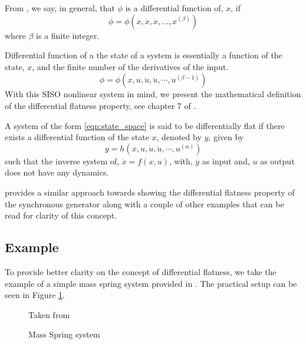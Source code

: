 \documentclass[letterpaper%
, twoside%
, 12pt%
,memoire%
, english%
,creativecommons,hyperref%
]{thETS}
\begin{document}
\begin{definition}
	From \citep{teschl2012ordinary}, we say, in general, that $\phi$ is a differential function of, $x$, if\\
	\begin{equation*}
		\phi=\phi(x,\dot{x},\ddot{x},...,x^{(\beta)})
	\end{equation*}
	where $\beta$ is a finite integer.
\end{definition}
Differential function of a the state of a system is essentially a function of the state, $x$, and the finite number of the derivatives of the input. 
\begin{equation*}
	\phi=\phi(x,u,\dot{u},\ddot{u},\cdots,u^{(\beta-1)})
\end{equation*}
With this SISO nonlinear system in mind, we present the mathematical definition of the differential flatness property, see chapter 7 of \citep{RN77}. 
\begin{definition} \label{def:diffFlat}
A system of the form \eqref{eqn:state_space} is said to be differentially flat if there exists a differential function of the state $x$, denoted by $y$, given by\\
	\begin{equation} \label{eqn:diffflat}
	y=h(x,u,\dot{u},\ddot{u},\cdots,u^{(\alpha)})
	\end{equation}
	such that the inverse system of, $\dot{x}=f(x,u)$, with, $y$ as input and, $u$ as output does not have any dynamics. 
\end{definition}
\citep{RN120} provides a similar approach towards showing the differential flatness property of the synchronous generator along with a couple of other examples that can be read for clarity of this concept. 
\subsection{Example}
To provide better clarity on the concept of differential flatness, we take the example of a simple mass spring system provided in \citep{levine2009differential}. The practical setup can be seen in Figure \ref{difflin}.
\begin{figure}
	\centering 
	\parbox{0.75\textwidth}{
		\begin{center}
		\caption{Mass Spring system\label{difflin}}Taken from \citep{levine2009differential}
		\end{center}	
	} 
\end{figure}
\end{document}
